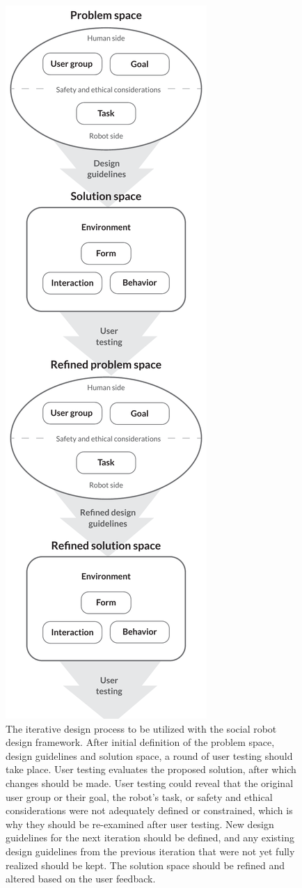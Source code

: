 \begin{figure}
\centering
  \includegraphics[scale=0.35]{images/design_iterations.pdf}
  \caption{The iterative design process to be utilized with the social robot design framework. After initial definition of the problem space, design guidelines and solution space, a round of user testing should take place. User testing evaluates the proposed solution, after which changes should be made. User testing could reveal that the original user group or their goal, the robot's task, or safety and ethical considerations were not adequately defined or constrained, which is why they should be re-examined after user testing. New design guidelines for the next iteration should be defined, and any existing design guidelines from the previous iteration that were not yet fully realized should be kept. The solution space should be refined and altered based on the user feedback.}

\end{figure}
